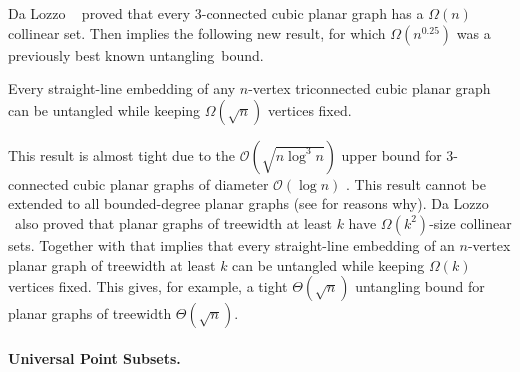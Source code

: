 Da Lozzo \etal~\cite{dalozzo.dujmovic.ea:drawing}  proved that every 3-connected cubic planar graph has
a $\Omega(n)$ collinear set. Then  implies the
following new result, for which $\Omega(n^{0.25})$ was a previously
  best known \mbox{untangling bound.} 

\begin{cor}
Every straight-line embedding of any $n$-vertex triconnected cubic
planar graph can be untangled while 
keeping $\Omega(\sqrt{n})$ vertices fixed. 
\end{cor}

This result is almost tight due to the $\mathcal{O}(\sqrt{n\log^3n })$ upper bound for 3-connected cubic planar graphs of diameter $\mathcal{O}(\log n)$ \cite{c-upg-10}. This result cannot be extended to all bounded-degree planar graphs (see \cite{dujmovic:utility,DBLP:journals/dm/Owens81} for
reasons why).  Da Lozzo \etal\ also proved that planar graphs of treewidth at least
$k$ have $\Omega(k^2)$-size collinear sets. Together with
  that implies that 
%
every straight-line embedding of an $n$-vertex planar graph of treewidth
at least $k$ can be untangled while keeping $\Omega(k)$ vertices fixed. 
%
This gives, for example, a tight $\Theta(\sqrt{n})$
untangling bound for planar graphs of treewidth
$\Theta(\sqrt{n})$.  



 \paragraph{Universal Point Subsets.}%


